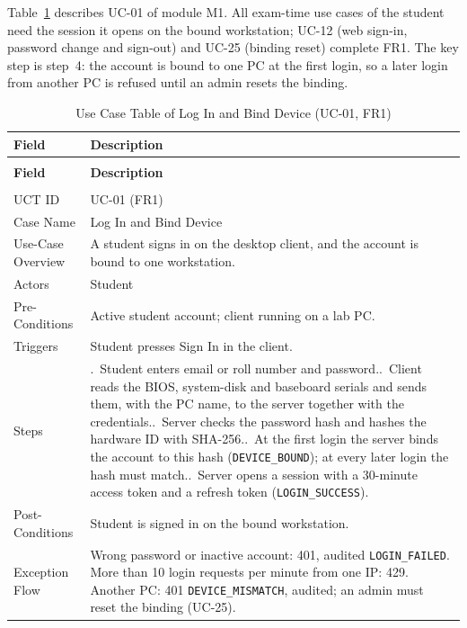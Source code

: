 
Table~\ref{tab:uct_auth_device} describes UC-01 of module M1. All exam-time use cases of the student need the session it opens on the bound workstation; UC-12 (web sign-in, password change and sign-out) and UC-25 (binding reset) complete FR1. The key step is step~4: the account is bound to one PC at the first login, so a later login from another PC is refused until an admin resets the binding.

{\renewcommand{\arraystretch}{1.1}\setlength{\tabcolsep}{6pt}
\begin{longtable}{>{\small\raggedright\arraybackslash}p{3.3cm}>{\small\raggedright\arraybackslash}p{\dimexpr\textwidth-3.3cm-4\tabcolsep\relax}}
\caption{Use Case Table of Log In and Bind Device (UC-01, FR1)}\label{tab:uct_auth_device}\\ \hline\hline
\textbf{Field} & \textbf{Description} \\ \hline\hline
\endfirsthead
\multicolumn{2}{c}{\small\tablename~\thetable{} -- continued from previous page}\\ \hline\hline
\textbf{Field} & \textbf{Description} \\ \hline\hline
\endhead
\hline \multicolumn{2}{r}{\small Continued on next page}\\
\endfoot
\hline\hline
\endlastfoot
UCT ID & UC-01 (FR1) \\*
Case Name & Log In and Bind Device \\*
Use-Case Overview & A student signs in on the desktop client, and the account is bound to one workstation. \\*
Actors & Student \\*
Pre-Conditions & Active student account; client running on a lab PC. \\*
Triggers & Student presses Sign In in the client. \\
Steps & 1.~Student enters email or roll number and password.\newline
2.~Client reads the BIOS, system-disk and baseboard serials and sends them, with the PC name, to the server together with the credentials.\newline
3.~Server checks the password hash and hashes the hardware ID with SHA-256.\newline
4.~At the first login the server binds the account to this hash (\texttt{DEVICE\_BOUND}); at every later login the hash must match.\newline
5.~Server opens a session with a 30-minute access token and a refresh token (\texttt{LOGIN\_SUCCESS}). \\
Post-Conditions & Student is signed in on the bound workstation. \\
Exception Flow & Wrong password or inactive account: 401, audited \texttt{LOGIN\_FAILED}. More than 10 login requests per minute from one IP: 429. Another PC: 401 \texttt{DEVICE\_MISMATCH}, audited; an admin must reset the binding (UC-25). \\
\end{longtable}}

